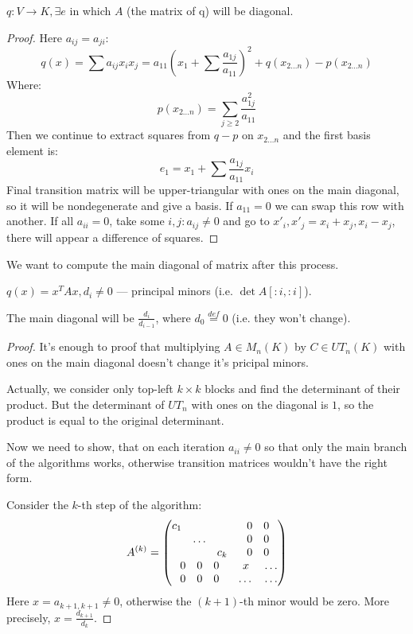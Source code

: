 \begin{thr}
    $q: V \to K, \exists e$ in which $A$ (the matrix of q) will be diagonal.
\end{thr}
\begin{proof}
    Here $a_{ij} = a_{ji}$:
    \[ q(x) = \sum a_{ij} x_i x_j = a_{11}(x_1 + \sum \frac{a_{1j}}{a_{11}})^2 + q(x_{2\dots n}) - p(x_{2\dots n}) \]
    Where:
    \[ p(x_{2\dots n}) = \sum\limits_{j\ge 2} \frac{a_{1j}^2}{a_{11}}\]
    Then we continue to extract squares from $q - p$ on $x_{2\dots n}$ and the first basis element is:
    \[ e_1 = x_1 + \sum \frac{a_{1j}}{a_{11}} x_i \]
    Final transition matrix will be upper-triangular with ones on the main diagonal, so it will be nondegenerate and give
    a basis.
    If $a_{11} = 0$ we can swap this row with another. If all $a_{ii} = 0$, take some $i, j: a_{ij} \ne 0$ and go to 
    $x'_i, x'_j = x_i + x_j, x_i - x_j$, there will appear a difference of squares.
\end{proof}

We want to compute the main diagonal of matrix after this process.
\begin{thr} 
    $q(x) = x^T A x, d_i \ne 0$ --- principal minors (i.e. $\det A[:i, :i]$).

    The main diagonal will be $\frac{d_i}{d_{i-1}}$, where $d_0 \stackrel{def}{=} 0$
    (i.e. they won't change).
\end{thr}
\begin{proof}
    It's enough to proof that multiplying $A \in M_n(K)$ by $C \in UT_n(K)$ with ones on
    the main diagonal doesn't change it's pricipal minors.

    Actually, we consider only top-left $k\times k$ blocks and find the determinant of 
    their product. But the determinant of $UT_n$ with ones on the diagonal is $1$, so the product is equal 
    to the original determinant.

    Now we need to show, that on each iteration $a_{ii} \ne 0$ so that only the main 
    branch of the algorithms works, otherwise transition matrices wouldn't have the right form.
    
    Consider the $k$-th step of the algorithm:
    \[ A^{(k)} = \begin{pmatrix}
        \mqty{\dmat{c_1, \dots, c_k}} & \mqty{\zmat{3}{2}} \\
        \mqty{\zmat{2}{3}} & \mqty{x & \dots \\ \dots & \dots} \\
    \end{pmatrix} \]
    Here $x = a_{k+1,k+1} \ne 0$, otherwise the $(k+1)$-th minor would be zero.
    More precisely, $x = \frac{d_{k+1}}{d_k}$.
\end{proof}

